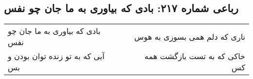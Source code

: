 \begin{center}
\section*{رباعی شماره ۲۱۷: بادی که بیاوری به ما جان چو نفس}
\label{sec:sh217}
\begin{longtable}{l p{0.5cm} r}
بادی که بیاوری به ما جان چو نفس
&&
ناری که دلم همی بسوزی به هوس
\\
آبی که به تو زنده توان بودن و بس
&&
خاکی که به تست بازگشت همه کس
\\
\end{longtable}
\end{center}
